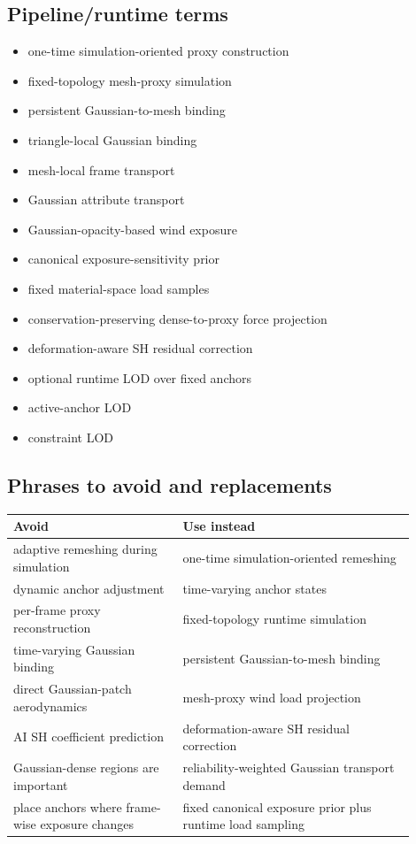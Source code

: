 \documentclass[11pt,a4paper]{article}
\begin{document}
\subsection{Pipeline/runtime terms}

\begin{itemize}[leftmargin=2em]
\item one-time simulation-oriented proxy construction
\item fixed-topology mesh-proxy simulation
\item persistent Gaussian-to-mesh binding
\item triangle-local Gaussian binding
\item mesh-local frame transport
\item Gaussian attribute transport
\item Gaussian-opacity-based wind exposure
\item canonical exposure-sensitivity prior
\item fixed material-space load samples
\item conservation-preserving dense-to-proxy force projection
\item deformation-aware SH residual correction
\item optional runtime LOD over fixed anchors
\item active-anchor LOD
\item constraint LOD
\end{itemize}

\subsection{Phrases to avoid and replacements}

\begin{longtable}{>{\raggedright\arraybackslash}p{0.38\linewidth} >{\raggedright\arraybackslash}p{0.52\linewidth}}
\toprule
Avoid & Use instead \\
\midrule
adaptive remeshing during simulation & one-time simulation-oriented remeshing \\
dynamic anchor adjustment & time-varying anchor states \\
per-frame proxy reconstruction & fixed-topology runtime simulation \\
time-varying Gaussian binding & persistent Gaussian-to-mesh binding \\
direct Gaussian-patch aerodynamics & mesh-proxy wind load projection \\
AI SH coefficient prediction & deformation-aware SH residual correction \\
Gaussian-dense regions are important & reliability-weighted Gaussian transport demand \\
place anchors where frame-wise exposure changes & fixed canonical exposure prior plus runtime load sampling \\
\bottomrule
\end{longtable}
\end{document}

